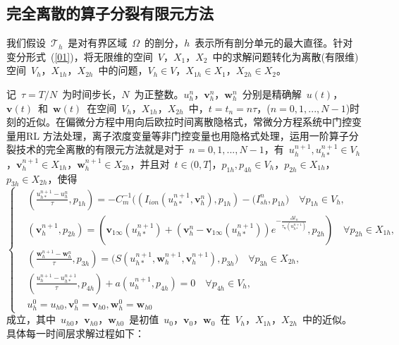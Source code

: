 \documentclass[twoside,UTF8]{nputhesis}
\begin{document}
\subsection{完全离散的算子分裂有限元方法}
我们假设~$\mathcal {T}_h$~是对有界区域~$\Omega$~的剖分，$h$~表示所有剖分单元的最大直径。针对变分形式~(\ref{01})，将无限维的空间~$V$，$X_1$，$X_2$~中的求解问题转化为离散(有限维)空间~$V_h$，$X_{1h}$，$X_{2h}$~中的问题，$V_h\in V$，$X_{1h}\in X_1$，$X_{2h}\in X_2$。

记~$\tau=T/N$~为时间步长，$N$~为正整数。$u^n_h$，$\textbf{v}^n_h$，$\textbf{w}^n_h$~分别是精确解~$u(t)$，$\textbf{v}(t)$~和~$\textbf{w}(t)$~在空间~$V_h$，$X_{1h}$，$X_{2h}$~中，$t=t_{n}=n\tau$，($n=0,1,...,N-1$)时刻的近似。在偏微分方程中用向后欧拉时间离散隐格式，常微分方程系统中门控变量用RL 方法处理，离子浓度变量等非门控变量也用隐格式处理，运用一阶算子分裂技术的完全离散的有限元方法就是对于~$n=0,1,...,N-1$，有~$u^{n+1}_h, u^{n+1}_{h*}\in V_h$，$\textbf{v}^{n+1}_h\in X_{1h}$，$\textbf{w}^{n+1}_h\in X_{2h}$，并且对~$t\in (0,T]$，$p_{1h},p_{4h}\in V_h$，$p_{2h}\in X_{1h}$，$p_{3h}\in X_{2h}$，使得
\begin{equation}
\left\{\begin{aligned}&(\frac{u^{n+1}_{h*}-u^n_h}{\tau},p_{1h})=-C_m^{-1}\big((I_{ion}(u^{n+1}_{h*},\textbf{v}^n_h),p_{1h})-(I_{sh}^n,p_{1h}\big)\quad \forall  p_{1h}\in V_h,
\\&(\textbf{v}^{n+1}_{h},p_{2h})=(\textbf{v}_{1\infty}(u^{n+1}_{h*})+(\textbf{v}^{n}_{h}-\textbf{v}_{1\infty}(u^{n+1}_{h*}))e^{-\frac{\Delta t_n}{\tau_\textbf{v}(u^{n+1}_{h*})}},p_{2h})\quad \forall p_{2h}\in X_{1h},
\\&(\frac{\textbf{w}^{n+1}_{h}-\textbf{w}^n_{h}}{\tau},p_{3h})=\big(S(u^{n+1}_{h*},\textbf{w}^{n+1}_{h},\textbf{v}^{n+1}_{h}),p_{3h}\big)\quad \forall p_{3h}\in X_{2h},
\\&(\frac{u^{n+1}_{h}-u^{n+1}_{h*}}{\tau},p_{4h})+a(u^{n+1}_{h}, p_{4h})=0\quad \forall p_{4h}\in V_h,
\\&u^0_h=u_{h0}, \textbf{v}^0_h=\textbf{v}_{h0}, \textbf{w}^0_h=\textbf{w}_{h0}\end{aligned}\right.
\label{092}
\end{equation}
成立，其中~$u_{h0}$，$\textbf{v}_{h0}$，$\textbf{w}_{h0}$~是初值~$u_0$，$\textbf{v}_0$，$\textbf{w}_{0}$~在~$V_h$，$X_{1h}$，$X_{2h}$~中的近似。
具体每一时间层求解过程如下：
\end{document}
